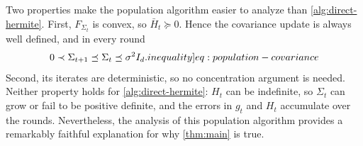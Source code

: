 \documentclass[12pt,cleveref]{jmlr}
\newcommand{\ineqlabel}[1]{\label[inequality]{#1}}
\newcommand{\1}{\mathbf 1}
\begin{document}
Two properties make the population algorithm easier to analyze than \cref{alg:direct-hermite}.
First, $F_{\Sigma_t}$ is convex, so $\bar H_t\succeq0$.
Hence the covariance update is always well defined, and in every round
\begin{align}
    0\prec\Sigma_{t+1}\preceq\Sigma_t\preceq\sigma^2I_d.
    \ineqlabel{eq:population-covariance}
\end{align}
Second, its iterates are deterministic, so no concentration argument is needed.
Neither property holds for \cref{alg:direct-hermite}: $H_t$ can be indefinite, so $\Sigma_t$ can grow or fail to be positive definite, and the errors in $g_t$ and $H_t$ accumulate over the rounds.
Nevertheless, the analysis of this population algorithm provides a remarkably faithful explanation for why \cref{thm:main} is true.
\end{document}

